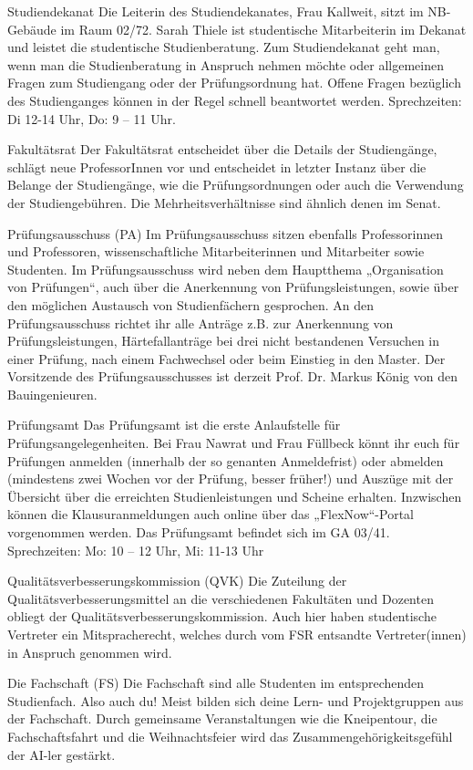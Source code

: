 Studiendekanat
Die Leiterin des Studiendekanates, Frau Kallweit, sitzt im NB-Gebäude im Raum 02/72. Sarah Thiele ist studentische Mitarbeiterin im Dekanat und leistet die studentische Studienberatung. Zum Studiendekanat geht man, wenn man die Studienberatung in Anspruch nehmen möchte oder allgemeinen Fragen zum Studiengang oder der Prüfungsordnung hat. Offene Fragen bezüglich des Studienganges können in der Regel schnell beantwortet werden. 
Sprechzeiten: Di 12-14 Uhr, Do: 9 – 11 Uhr.

Fakultätsrat
Der Fakultätsrat entscheidet über die Details der Studiengänge, schlägt neue ProfessorInnen vor und entscheidet in letzter Instanz über die Belange der Studiengänge, wie die Prüfungsordnungen oder auch die Verwendung der Studiengebühren. Die Mehrheitsverhältnisse sind ähnlich denen im Senat.

Prüfungsausschuss (PA)
Im Prüfungsausschuss sitzen ebenfalls Professorinnen und Professoren, wissenschaftliche Mitarbeiterinnen und Mitarbeiter sowie Studenten. Im Prüfungsausschuss wird neben dem 
Hauptthema „Organisation von Prüfungen“, auch über die Anerkennung von Prüfungsleistungen, sowie über den möglichen Austausch von Studienfächern gesprochen. An den Prüfungsausschuss 
richtet ihr alle Anträge z.B. zur Anerkennung von Prüfungsleistungen, Härtefallanträge bei drei nicht bestandenen Versuchen in einer Prüfung, nach einem Fachwechsel oder beim Einstieg in den Master. Der Vorsitzende des Prüfungsausschusses ist derzeit Prof. Dr. Markus König von den Bauingenieuren.

Prüfungsamt
Das Prüfungsamt ist die erste Anlaufstelle für Prüfungsangelegenheiten. Bei Frau Nawrat und Frau Füllbeck könnt ihr euch für Prüfungen anmelden (innerhalb der so genanten Anmeldefrist) oder abmelden (mindestens zwei Wochen vor der Prüfung, besser früher!) und Auszüge mit der Übersicht über die erreichten Studienleistungen und Scheine erhalten. Inzwischen können die Klausuranmeldungen auch online über das „FlexNow“-Portal vorgenommen werden. Das Prüfungsamt befindet sich im GA 03/41.
Sprechzeiten: Mo: 10 – 12 Uhr, Mi: 11-13 Uhr

Qualitätsverbesserungskommission (QVK)
Die Zuteilung der Qualitätsverbesserungsmittel an die verschiedenen Fakultäten und Dozenten obliegt der Qualitätsverbesserungskommission. Auch hier haben studentische Vertreter ein Mitspracherecht, welches durch vom FSR entsandte Vertreter(innen) in Anspruch genommen wird.

Die Fachschaft (FS)
Die Fachschaft sind alle Studenten im entsprechenden Studienfach. Also auch du! Meist bilden sich deine Lern- und Projektgruppen aus der Fachschaft. Durch gemeinsame Veranstaltungen wie die Kneipentour, die Fachschaftsfahrt und die Weihnachtsfeier wird das Zusammengehörigkeitsgefühl der AI-ler gestärkt.

